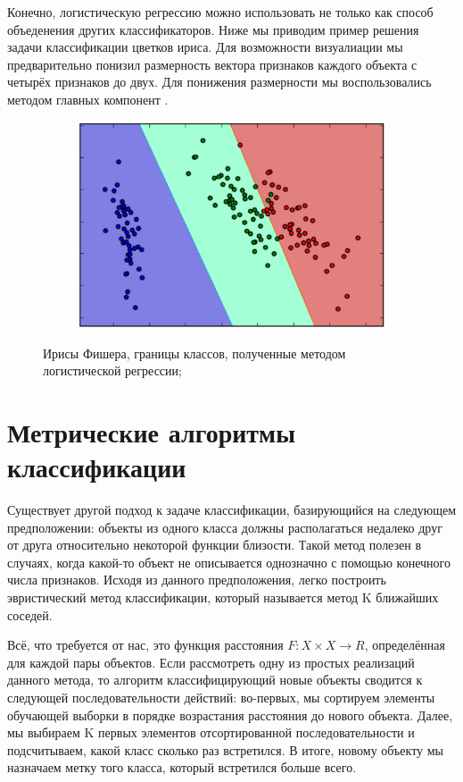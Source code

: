 Конечно, логистическую регрессию можно использовать не только как способ объеденения других классификаторов. Ниже мы приводим пример решения задачи классификации цветков ириса. Для возможности визуалиации мы предварительно понизил размерность вектора признаков каждого объекта с четырёх признаков до двух. Для понижения размерности мы воспользовались методом главных компонент \cite{pca_book}\cite{pca_program}.

\begin{figure}[ht]
	\centering
    \begin{subfigure}[b]{1\textwidth}
    \centering
        \includegraphics[scale=0.5]{pasted-image-19.png}        
    \end{subfigure}
 
    \caption{Ирисы Фишера, границы классов, полученные методом логистической регрессии;}
    \label{fig_parsetree}
\end{figure}

\section{Метрические алгоритмы классификации}

Существует другой подход к задаче классификации, базирующийся на следующем предположении: объекты из одного класса должны располагаться недалеко друг от друга относительно некоторой функции близости. Такой метод полезен в случаях, когда какой-то объект не описывается однозначно с помощью конечного числа признаков. Исходя из данного предположения, легко построить эвристический метод классификации, который называется метод K ближайших соседей.

Всё, что требуется от нас, это функция расстояния $F : X \times X \to R$, определённая для каждой пары объектов. Если рассмотреть одну из простых реализаций данного метода, то алгоритм классифицирующий новые объекты сводится к следующей последовательности действий: во-первых, мы сортируем элементы обучающей выборки в порядке возрастания  расстояния до нового объекта. Далее, мы выбираем K первых элементов отсортированной последовательности и подсчитываем, какой класс сколько раз встретился. В итоге, новому объекту мы назначаем метку того класса, который встретился больше всего.

